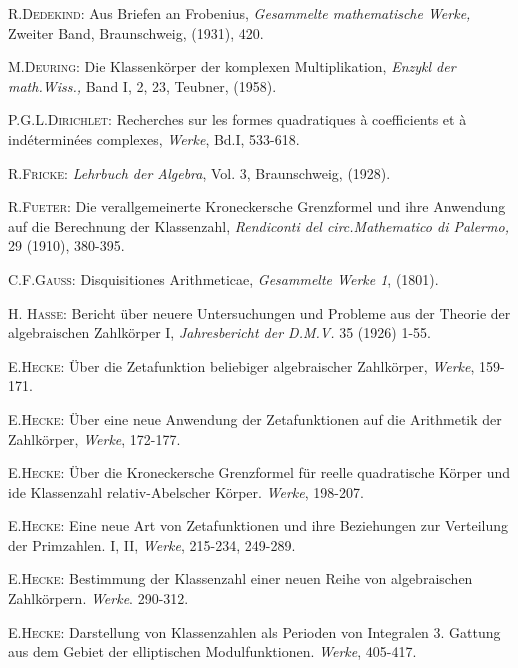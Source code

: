 \begin{thebibliography}{99}\pageoriginale
{} \textsc{R.\@ Dedekind:} Aus Briefen an Frobenius, {\em
  Gesammelte mathematische Werke,} Zweiter Band, Braunschweig, (1931), 420.

 \textsc{M.\@ Deuring:} Die Klassenk\"orper der komplexen
  Multiplikation, {\em Enzykl der math.\@ Wiss.,} Band I, 2, 23,
  Teubner, (1958).

 \textsc{P.G.L.\@ Dirichlet:} Recherches sur les formes
  quadratiques \`a coefficients et \`a ind\'etermin\'ees complexes,
  {\em Werke}, Bd.\@ I, 533-618.

 \textsc{R.\@ Fricke:} {\em Lehrbuch der Algebra}, Vol.\@
  3, Braunschweig, (1928).

 \textsc{R.\@ Fueter:} Die verallgemeinerte Kroneckersche
  Grenzformel und ihre Anwendung auf die Berechnung der Klassenzahl,
  {\em Rendiconti del circ.\@ Mathematico di Palermo,} 29 (1910), 380-395.

 \textsc{C.F.\@ Gauss:} Disquisitiones Arithmeticae, {\em
  Gesammelte Werke 1}, (1801).

 \textsc{H. Hasse:} Bericht \"uber neuere Untersuchungen
  und Probleme aus der Theorie der algebraischen Zahlk\"orper I, {\em
    Jahresbericht der D.\@ M.\@ V.\@} 35 (1926) 1-55.

 \textsc{E.\@ Hecke:} \"Uber die Zetafunktion beliebiger
  algebraischer Zahlk\"orper, {\em Werke}, 159-171.

 \textsc{E.\@ Hecke:} \"Uber eine neue Anwendung der
  Zetafunktionen auf die Arithmetik der Zahlk\"orper, {\em Werke}, 172-177.

 \textsc{E.\@ Hecke:} \"Uber die Kroneckersche Grenzformel
  f\"ur reelle quadratische K\"orper und ide Klassenzahl
  relativ-Abelscher K\"orper. {\em Werke}, 198-207.

 \textsc{E.\@ Hecke:} Eine neue Art von Zetafunktionen und
  ihre Beziehungen zur Verteilung der Primzahlen. I, II, {\em Werke},
  215-234, 249-289.

 \textsc{E.\@ Hecke:} Bestimmung der Klassenzahl einer
  neuen Reihe von algebraischen Zahlk\"orpern. {\em Werke}. 290-312.

 \textsc{E.\@ Hecke:} Darstellung von Klassenzahlen als
  Perioden von Integralen 3. Gattung aus dem Gebiet der elliptischen
  Modulfunktionen. {\em Werke}, 405-417.


\end{thebibliography}
